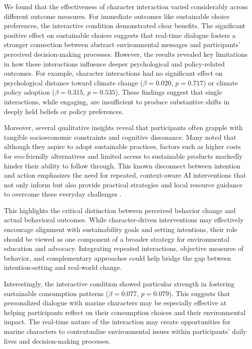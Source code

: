 \documentclass[sigconf, nonacm]{acmart}
\begin{document}
We found that the effectiveness of character interaction varied considerably across different outcome measures. For immediate outcomes like sustainable choice preferences, the interactive condition demonstrated clear benefits. The significant positive effect on sustainable choices suggests that real-time dialogue fosters a stronger connection between abstract environmental messages and participants’ perceived decision-making processes. However, the results revealed key limitations in how these interactions influence deeper psychological and policy-related outcomes. For example, character interactions had no significant effect on psychological distance toward climate change ($\beta = 0.020$, $p = 0.717$) or climate policy adoption ($\beta = 0.315$, $p = 0.535$). These findings suggest that single interactions, while engaging, are insufficient to produce substantive shifts in deeply held beliefs or policy preferences.

Moreover, several qualitative insights reveal that participants often grapple with tangible socioeconomic constraints and cognitive dissonance. Many noted that although they aspire to adopt sustainable practices, factors such as higher costs for eco-friendly alternatives and limited access to sustainable products markedly hinder their ability to follow through. This known disconnect between intention and action emphasizes the need for repeated, context-aware AI interventions that not only inform but also provide practical strategies and local resource guidance to overcome these everyday challenges \cite{ElHaffar2020}.

This highlights the critical distinction between perceived behavior change and actual behavioral outcomes. While character-driven interventions may effectively encourage alignment with sustainability goals and setting intentions, their role should be viewed as one component of a broader strategy for environmental education and advocacy. Integrating repeated interactions, objective measures of behavior, and complementary approaches could help bridge the gap between intention-setting and real-world change.

Interestingly, the interactive condition showed particular strength in fostering sustainable consumption patterns  ($\beta = 0.077$, $p = 0.079$). This suggests that personalized dialogue with marine characters may be especially effective at helping participants reflect on their consumption choices and their environmental impact. The real-time nature of the interaction may create opportunities for marine characters to contextualize environmental issues within participants' daily lives and decision-making processes.
\end{document}
